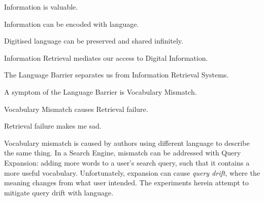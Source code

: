 \begin{center}
    
Information is valuable.

Information can be encoded with language.

Digitised language can be preserved and shared infinitely.

Information Retrieval mediates our access to Digital Information.

The Language Barrier separates us from Information Retrieval Systems.

A symptom of the Language Barrier is Vocabulary Mismatch.

Vocabulary Mismatch causes Retrieval failure.

Retrieval failure makes me sad.
    
\end{center}

\vspace{\baselineskip}

Vocabulary mismatch is caused by authors using different language to describe the same thing. In a Search Engine, mismatch can be addressed with Query Expansion: adding more words to a user's search query, such that it contains a more useful vocabulary. Unfortunately, expansion can cause \textit{query drift}, where the meaning changes from what user intended. The experiments herein attempt to mitigate query drift with language. 